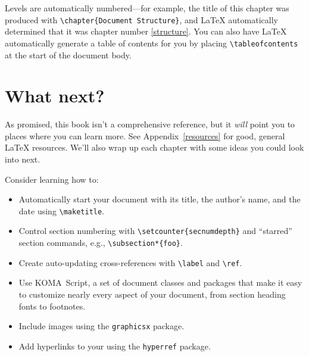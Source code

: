 Levels are automatically numbered---for example,
the title of this chapter was produced with \verb|\chapter{Document Structure}|,
and \LaTeX{} automatically determined that it was chapter number \ref{structure}.
You can also have \LaTeX{} automatically generate a table of contents for you
by placing \verb|\tableofcontents| at the start of the document body.

\section{What next?}

As promised, this book isn't a comprehensive reference,
but it \emph{will} point you to places where you can learn more.
See Appendix~\ref{resources} for good, general \LaTeX{} resources.
We'll also wrap up each chapter with some ideas you could look into next.

Consider learning how to:
\begin{itemize}
\item Automatically start your document with its title, the author's name,
    and the date using \verb|\maketitle|.
\item Control section numbering with \verb|\setcounter{secnumdepth}|
and ``starred'' section commands, e.g., \verb|\subsection*{foo}|.
\item Create auto-updating cross-references with \verb|\label| and \verb|\ref|.
\item Use KOMA~Script, a set of document classes and packages
that make it easy to customize nearly every aspect of your document,
from section heading fonts to footnotes.
\item Include images using the \texttt{graphicsx} package.
\item Add hyperlinks to your  using the \texttt{hyperref} package.
\end{itemize}
